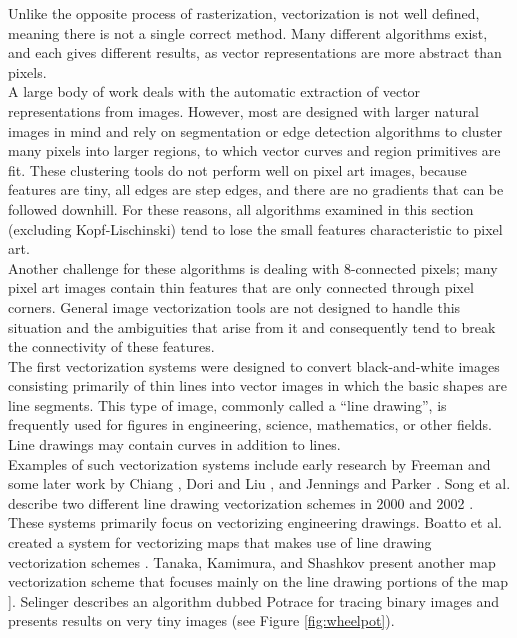 \documentclass[]{usiinfbachelorproject}
\begin{document}
Unlike the opposite process of rasterization, vectorization is not well defined, meaning there is not a single correct method. Many different algorithms exist, and each gives different results, as vector representations are more abstract than pixels.\\
A large body of work deals with the automatic extraction of vector representations from images. However, most are designed with larger natural images in mind and rely on segmentation or edge detection algorithms to cluster many pixels into larger regions, to which vector curves and region primitives are fit. These clustering tools do not perform well on pixel art images, because features are tiny, all edges are step edges, and there are no gradients that can be followed downhill. For these reasons, all algorithms examined in this section (excluding Kopf-Lischinski) tend to lose the small features characteristic to pixel art.\\
Another challenge for these algorithms is dealing with 8-connected pixels; many pixel art images contain thin features that are only connected through pixel corners. General image vectorization tools are not designed to handle this situation and the ambiguities that arise from it and consequently tend to break the connectivity of these features.\\

The first vectorization systems were designed to convert black-and-white images consisting primarily of thin lines into vector images in which the basic shapes are line segments. This type of image, commonly called a ``line drawing'', is frequently used for figures in engineering, science, mathematics, or other fields. Line drawings may contain curves in addition to lines. \\
Examples of such vectorization systems include early research by Freeman \cite{Freeman1961} and some later work by Chiang \cite{Chiang1995}, Dori and Liu \cite{Dori1999}, and Jennings and Parker \cite{Jennings1994}. Song et al. describe two different line drawing vectorization schemes in 2000 and 2002 \cite{Song2000, Song2002}. These systems primarily focus on vectorizing engineering drawings. Boatto et al. created a system for vectorizing maps that makes use of line drawing vectorization schemes \cite{Boatto1992}. Tanaka, Kamimura, and Shashkov present another map vectorization scheme that focuses mainly on the line drawing portions of the map \cite{Tanaka1993}]. Selinger describes an algorithm dubbed Potrace for tracing binary images and presents results on very tiny images \cite{Selinger2003} (see Figure \ref{fig:wheelpot}).
\end{document}
